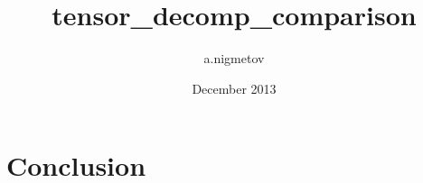\documentclass{report}
\title{tensor_decomp_comparison}
\author{a.nigmetov }
\date{December 2013}
\begin{document}
\tableofcontents

% 













\chapter{Conclusion}




{}

\end{document}
